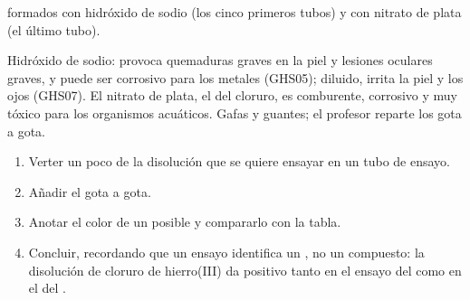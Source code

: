 \begin{omfigure}

{\small {} formados con hidróxido de sodio (los cinco primeros
tubos) y con nitrato de plata (el último tubo).}
\end{omfigure}

\begin{safety}{}
Hidróxido de sodio: provoca quemaduras graves en la piel y lesiones
oculares graves, y puede ser corrosivo para los metales (GHS05); diluido,
irrita la piel y los ojos (GHS07). El nitrato de plata, el  del
cloruro, es comburente, corrosivo y muy tóxico para los organismos
acuáticos. Gafas y guantes; el profesor reparte los  gota a
gota.
\end{safety}

\begin{method}\label{met:g9:ions:test}
\begin{enumerate}
  \item Verter un poco de la disolución que se quiere ensayar en un tubo
        de ensayo.
  \item Añadir el  gota a gota.
  \item Anotar el color de un posible  y compararlo con la
        tabla.
  \item Concluir, recordando que un ensayo identifica un , no un
        compuesto: la disolución de cloruro de hierro(III) da positivo
        tanto en el ensayo del  como en el del .
\end{enumerate}
\end{method}

